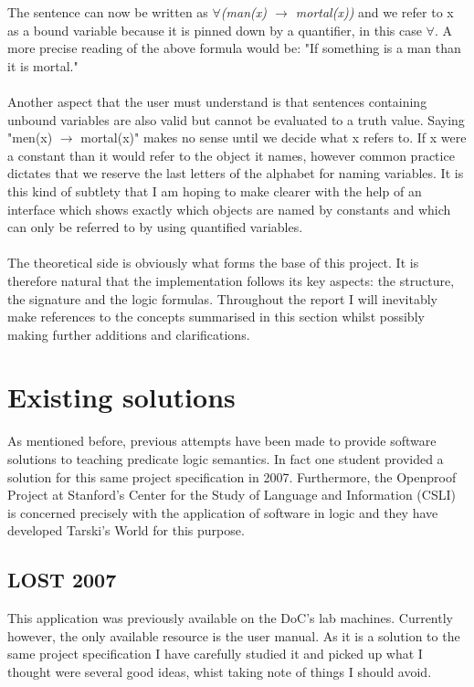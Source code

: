 \documentclass{report}
\begin{document}
\noindent The sentence can now be written as
\emph{$\forall$(man(x) $\rightarrow$ mortal(x))}
and we refer to x as a bound variable because it is pinned down by a quantifier,
in this case $\forall$. A more precise reading of the above formula would be:
"If something is a man than it is mortal." 
\\ \\
Another aspect that the user must understand is that sentences containing 
unbound variables are also valid but cannot be evaluated to a truth value. 
Saying "men(x) $\rightarrow$ mortal(x)" makes no sense until we decide what x 
refers to. If x were a constant than it would refer to the object it names, 
however common practice dictates that we reserve the last letters of the 
alphabet for naming variables. It is this kind of subtlety that I am hoping
to make clearer with the help of an interface which shows exactly which objects
are named by constants and which can only be referred to by using quantified 
variables. 
\\ \\
The theoretical side is obviously what forms the base of this project. It is 
therefore natural that the implementation follows its key aspects: the 
structure, the signature and the logic formulas. Throughout the report I will 
inevitably make references to the concepts summarised in this section whilst 
possibly making further additions and clarifications.

\section{Existing solutions}
As mentioned before, previous attempts have been made to provide software 
solutions to teaching predicate logic semantics. In fact one student provided a 
solution for this same project specification in 2007. Furthermore, the Openproof
Project at Stanford's Center for the Study of Language and Information (CSLI) 
is concerned precisely with the application of software in logic and they have 
developed Tarski's World for this purpose.

\subsection{LOST 2007}
This application was previously available on the DoC's lab machines. Currently 
however, the only available resource is the user manual. As it is a solution to 
the same project specification I have carefully studied it and picked up what I 
thought were several good ideas, whist taking note of things I should avoid.
\end{document}
